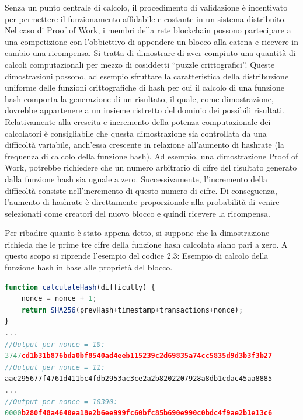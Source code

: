 Senza un punto centrale di calcolo, il procedimento di validazione è incentivato per permettere il funzionamento affidabile e costante in un sistema distribuito. Nel caso di Proof of Work, i membri della rete blockchain possono partecipare a una competizione con l’obbiettivo di appendere un blocco alla catena e ricevere in cambio una ricompensa. Si tratta di dimostrare di aver compiuto una quantità di calcoli computazionali per mezzo di cosiddetti “puzzle crittografici”. Queste dimostrazioni possono, ad esempio sfruttare la caratteristica della distribuzione uniforme delle funzioni crittografiche di hash per cui il calcolo di una funzione hash comporta la generazione di un risultato, il quale, come dimostrazione, dovrebbe appartenere a un insieme ristretto del dominio dei possibili risultati. Relativamente alla crescita e incremento della potenza computazionale dei calcolatori è consigliabile che questa dimostrazione sia controllata da una difficoltà variabile, anch’essa crescente in relazione all’aumento di hashrate (la frequenza di calcolo della funzione hash). Ad esempio, una dimostrazione Proof of Work, potrebbe richiedere che un numero arbitrario di cifre del risultato generato dalla funzione hash sia uguale a zero. Successivamente, l’incremento della difficoltà consiste nell’incremento di questo numero di cifre. Di conseguenza, l’aumento di hashrate è direttamente proporzionale alla probabilità di venire selezionati come creatori del nuovo blocco e quindi ricevere la ricompensa.

Per ribadire quanto è stato appena detto, si suppone che la dimostrazione richieda che le prime tre cifre della funzione hash calcolata siano pari a zero.
A questo scopo si riprende l'esempio del codice 2.3: Esempio di calcolo della funzione hash in base alle proprietà del blocco. 
\\
\begin{lstlisting}[caption={Esempio di calcolo della funzione hash in base alle proprietà del blocco},language=JavaScript]
function calculateHash(difficulty) {
    nonce = nonce + 1;
    return SHA256(prevHash+timestamp+transactions+nonce);
}
...
//Output per nonce = 10:
3747cd1b31b876bda0bf8540ad4eeb115239c2d69835a74cc5835d9d3b3f3b27
//Output per nonce = 11:
aac295677f4761d411bc4fdb2953ac3ce2a2b8202207928a8db1cdac45aa8885
...
//Output per nonce = 10390:
0000b280f48a4640ea18e2b6ee999fc60bfc85b690e990c0bdc4f9ae2b1e13c6

\end{lstlisting}

